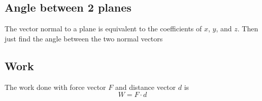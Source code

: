 \documentclass[../main.tex]{subfiles}
\begin{document}
\subsection{Angle between 2 planes}
The vector normal to a plane is equivalent to the coefficients of $x$, $y$, and $z$.
Then just find the angle between the two normal vectors

\subsection{Work}
The work done with force vector $F$ and distance vector $d$ is 
\begin{equation*}
	W = F \cdot d
\end{equation*}
\end{document}
